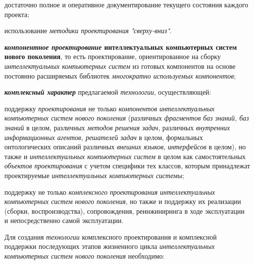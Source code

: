 \begin{textitemize}
\begin{textitemize}
		\item  достаточно полное и оперативное документирование текущего состояния каждого проекта;
		
		\item  использование \textit{методики проектирования} \textit{"сверху-вниз"{}}.
	\end{textitemize}
	
	\item \textbf{\textit{компонентное проектирование} интеллектуальных компьютерных систем нового поколения}, то есть проектирование, ориентированное на сборку \textit{интеллектуальных компьютерных систем} из готовых компонентов на основе постоянно расширяемых библиотек \textit{многократно используемых компонентов};
	
	\item  \textbf{\textit{комплексный характер}} предлагаемой \textit{технологии}, осуществляющей:
	
	\begin{textitemize}
		\item  поддержку \textit{проектирования} не только \textit{компонентов} \textit{интеллектуальных компьютерных систем нового поколения} (различных \textit{фрагментов баз знаний, баз знаний} в целом, различных \textit{методов решения задач}, различных \textit{внутренних информационных агентов, решателей задач} в целом, формальных онтологических описаний различных \textit{внешних языков}, \textit{интерфейсов} в целом), но также и \textit{интеллектуальных компьютерных систем} в целом как самостоятельных \textit{объектов проектирования} с учетом специфики тех классов, которым принадлежат проектируемые \textit{интеллектуальных компьютерных системы};
		
		\item  поддержку не только \textit{комплексного} \textit{проектирования} \textit{интеллектуальных компьютерных систем} \textit{нового поколения}, но также и поддержку их реализации (сборки, воспроизводства), сопровождения, реинжиниринга в ходе эксплуатации и непосредственно самой эксплуатации.
		
	\end{textitemize}
\end{textitemize}

Для создания \textit{технологии} комплексного проектирования и комплексной поддержки последующих этапов жизненного цикла \textit{интеллектуальных компьютерных систем нового поколения} необходимо:

